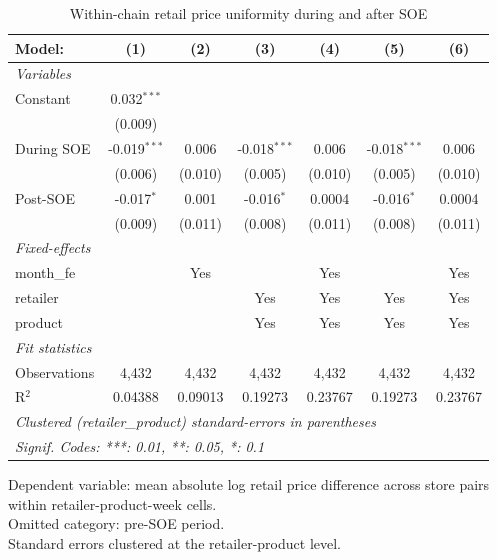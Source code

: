 
\begin{table}[htbp]
   \caption{\label{tab:uniformity_retail} Within-chain retail price uniformity during and after SOE}
   \centering
   \begin{tabular}{lcccccc}
      \tabularnewline \midrule \midrule
      Model:       & (1)            & (2)     & (3)            & (4)     & (5)            & (6)\\  
      \midrule
      \emph{Variables}\\
      Constant     & 0.032$^{***}$  &         &                &         &                &   \\   
                   & (0.009)        &         &                &         &                &   \\   
      During SOE   & -0.019$^{***}$ & 0.006   & -0.018$^{***}$ & 0.006   & -0.018$^{***}$ & 0.006\\   
                   & (0.006)        & (0.010) & (0.005)        & (0.010) & (0.005)        & (0.010)\\   
      Post-SOE     & -0.017$^{*}$   & 0.001   & -0.016$^{*}$   & 0.0004  & -0.016$^{*}$   & 0.0004\\   
                   & (0.009)        & (0.011) & (0.008)        & (0.011) & (0.008)        & (0.011)\\   
      \midrule
      \emph{Fixed-effects}\\
      month\_fe    &                & Yes     &                & Yes     &                & Yes\\  
      retailer     &                &         & Yes            & Yes     & Yes            & Yes\\  
      product      &                &         & Yes            & Yes     & Yes            & Yes\\  
      \midrule
      \emph{Fit statistics}\\
      Observations & 4,432          & 4,432   & 4,432          & 4,432   & 4,432          & 4,432\\  
      R$^2$        & 0.04388        & 0.09013 & 0.19273        & 0.23767 & 0.19273        & 0.23767\\  
      \midrule \midrule
      \multicolumn{7}{l}{\emph{Clustered (retailer\_product) standard-errors in parentheses}}\\
      \multicolumn{7}{l}{\emph{Signif. Codes: ***: 0.01, **: 0.05, *: 0.1}}\\
   \end{tabular}
   
   \par \raggedright 
   Dependent variable: mean absolute log retail price difference across store pairs within retailer-product-week cells.\\
   Omitted category: pre-SOE period.\\
   Standard errors clustered at the retailer-product level.
\end{table}


